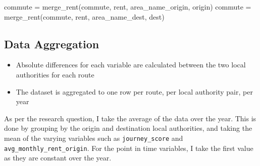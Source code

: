 \documentclass[
  number]{elsarticle}
\newenvironment{Shaded}{\begin{snugshade}}{\end{snugshade}}
\newcommand{\NormalTok}[1]{\textcolor[rgb]{0.00,0.23,0.31}{#1}}
\newcommand{\OperatorTok}[1]{\textcolor[rgb]{0.37,0.37,0.37}{#1}}
\newcommand{\StringTok}[1]{\textcolor[rgb]{0.13,0.47,0.30}{#1}}
\providecommand{\tightlist}{%
  \setlength{\itemsep}{0pt}\setlength{\parskip}{0pt}}
\begin{document}
\begin{Shaded}
\begin{Highlighting}[]
\NormalTok{commute }\OperatorTok{=}\NormalTok{ merge\_rent(commute, rent, }\StringTok{\textquotesingle{}area\_name\_origin\textquotesingle{}}\NormalTok{, }\StringTok{\textquotesingle{}origin\textquotesingle{}}\NormalTok{)}
\NormalTok{commute }\OperatorTok{=}\NormalTok{ merge\_rent(commute, rent, }\StringTok{\textquotesingle{}area\_name\_dest\textquotesingle{}}\NormalTok{, }\StringTok{\textquotesingle{}dest\textquotesingle{}}\NormalTok{)}
\end{Highlighting}
\end{Shaded}

\subsection{Data Aggregation}\label{sec-data-aggregation}

\begin{tcolorbox}[enhanced jigsaw, colframe=quarto-callout-tip-color-frame, opacityback=0, breakable, toptitle=1mm, titlerule=0mm, coltitle=black, colback=white, bottomtitle=1mm, left=2mm, arc=.35mm, leftrule=.75mm, opacitybacktitle=0.6, bottomrule=.15mm, colbacktitle=quarto-callout-tip-color!10!white, title=\textcolor{quarto-callout-tip-color}{\faLightbulb}\hspace{0.5em}{Subsection Summary}, rightrule=.15mm, toprule=.15mm]

\begin{itemize}
\tightlist
\item
  Absolute differences for each variable are calculated between the two
  local authorities for each route
\item
  The dataset is aggregated to one row per route, per local authority
  pair, per year
\end{itemize}

\end{tcolorbox}

As per the research question, I take the average of the data over the
year. This is done by grouping by the origin and destination local
authorities, and taking the mean of the varying variables such as
\texttt{\textquotesingle{}journey\_score\textquotesingle{}} and
\texttt{\textquotesingle{}avg\_monthly\_rent\_origin\textquotesingle{}}.
For the point in time variables, I take the first value as they are
constant over the year.
\end{document}
